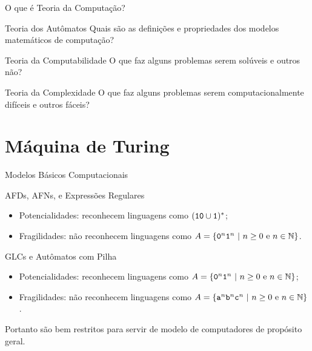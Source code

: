 \documentclass[xcolor=dvipsnames,table]{beamer}
\begin{document}
\begin{frame}{O que é Teoria da Computação?}
	\begin{block}{Teoria dos Autômatos}
		Quais são as definições e propriedades dos modelos matemáticos de computação?
	\end{block} \pause
	\begin{block}{Teoria da Computabilidade}
		O que faz alguns problemas serem solúveis e outros não?		
	\end{block} \pause
	\begin{block}{Teoria da Complexidade}
		O que faz alguns problemas serem computacionalmente difíceis e outros fáceis?
	\end{block}
\end{frame}

\section{Máquina de Turing}
\begin{frame}{Modelos Básicos Computacionais}
	\begin{block}{AFDs, AFNs, e Expressões Regulares}
		\begin{itemize}
			\item Potencialidades: reconhecem linguagens como $({\tt 10} \cup {\tt 1})^*$;
			\item Fragilidades: não reconhecem linguagens como $A = \{ {\tt 0}^n {\tt 1}^n \mbox{ | } n \geq 0 \mbox{ e } n \in \mathbb{N} \}$.
		\end{itemize}
	\end{block} \pause
	\begin{block}{GLCs e Autômatos com Pilha}
		\begin{itemize}
			\item Potencialidades: reconhecem linguagens como $A = \{ {\tt 0}^n {\tt 1}^n \mbox{ | } n \geq 0 \mbox{ e } n \in \mathbb{N} \}$;
			\item Fragilidades: não reconhecem linguagens como $A = \{ {\tt a}^n {\tt b}^n {\tt c}^n\mbox{ | } n \geq 0 \mbox{ e } n \in \mathbb{N} \}$.
		\end{itemize}
	\end{block} \pause
	\begin{alertblock}{}
		Portanto são bem restritos para servir de modelo de computadores de propósito geral.
	\end{alertblock}
\end{frame}
\end{document}
